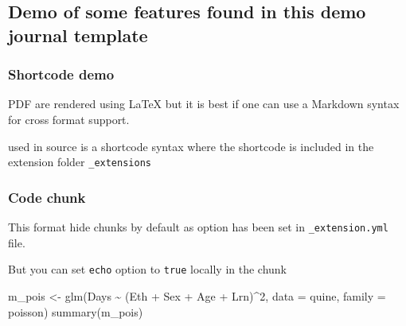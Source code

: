 \documentclass[
]{aft}
\newenvironment{Shaded}{\begin{snugshade}}{\end{snugshade}}
\newcommand{\AttributeTok}[1]{\textcolor[rgb]{0.40,0.45,0.13}{#1}}
\newcommand{\DecValTok}[1]{\textcolor[rgb]{0.68,0.00,0.00}{#1}}
\newcommand{\FunctionTok}[1]{\textcolor[rgb]{0.28,0.35,0.67}{#1}}
\newcommand{\NormalTok}[1]{\textcolor[rgb]{0.00,0.23,0.31}{#1}}
\newcommand{\OtherTok}[1]{\textcolor[rgb]{0.00,0.23,0.31}{#1}}
\newcommand{\SpecialCharTok}[1]{\textcolor[rgb]{0.37,0.37,0.37}{#1}}
\begin{document}
\subsection{Demo of some features found in this demo journal
template}\label{demo-of-some-features-found-in-this-demo-journal-template}

\subsubsection{Shortcode demo}\label{sec-shortcode}

PDF are rendered using {\LaTeX} but it is best if one can use a Markdown
syntax for cross format support.

\texttt{} used in source is a shortcode syntax where the shortcode is
included in the extension folder \texttt{\_extensions}

\subsubsection{Code chunk}\label{sec-chunks}

This format hide chunks by default as option has been set in
\texttt{\_extension.yml} file.

But you can set \texttt{echo} option to \texttt{true} locally in the
chunk

\begin{Shaded}
\begin{Highlighting}[]
\NormalTok{m\_pois }\OtherTok{\textless{}{-}} \FunctionTok{glm}\NormalTok{(Days }\SpecialCharTok{\textasciitilde{}}\NormalTok{ (Eth }\SpecialCharTok{+}\NormalTok{ Sex }\SpecialCharTok{+}\NormalTok{ Age }\SpecialCharTok{+}\NormalTok{ Lrn)}\SpecialCharTok{\^{}}\DecValTok{2}\NormalTok{, }\AttributeTok{data =}\NormalTok{ quine, }\AttributeTok{family =}\NormalTok{ poisson)}
\FunctionTok{summary}\NormalTok{(m\_pois)}
\end{Highlighting}
\end{Shaded}
\end{document}
